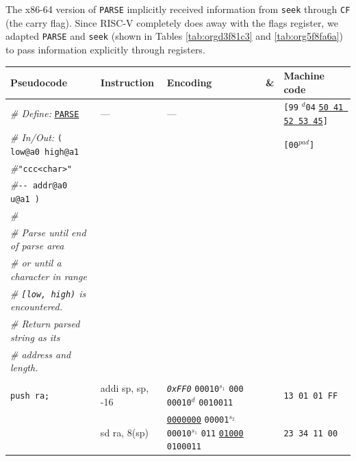 \documentclass[a4paper,12pt,final]{article}
\begin{document}
The x86-64 version of \texttt{PARSE} implicitly received information from
\texttt{seek} through \texttt{CF} (the carry flag).  Since RISC-V completely does
away with the flags register, we adapted \texttt{PARSE} and \texttt{seek} (shown in
Tables \ref{tab:orgd3f81c3} and \ref{tab:org5f8fa6a}) to pass information
explicitly through registers.

\begin{table}[!htbp] \begin{adjustwidth}{-1cm}{-1cm} \fontsize{8}{9.600000}\selectfont
\begin{center}
\begin{tabular}{l|ll|l|l}
\textbf{Pseudocode} & \textbf{Instruction} & \textbf{Encoding} & \textbf{\&} & \textbf{Machine code}\\[0pt]
\hline
\emph{\# Define:} \uline{\texttt{PARSE}} & --- & --- &  & \texttt{[99} \(^{d}\)​\texttt{04} \uline{\texttt{50 41 52 53 45}}​\texttt{]}\\[0pt]
\emph{\# In/Out:}    \texttt{( low@a0 high@a1} &  &  &  & \texttt{[00}​\(^{pad}\)​\texttt{]}\\[0pt]
\emph{\#}\hspace{4.9em}     ​\texttt{"ccc<char>"} &  &  &  & \\[0pt]
\emph{\#}\hspace{3.35em}​ \texttt{-​- addr@a0 u@a1 )} &  &  &  & \\[0pt]
\emph{\#} &  &  &  & \\[0pt]
\emph{\# Parse until end of parse area} &  &  &  & \\[0pt]
\emph{\# or until a character in range} &  &  &  & \\[0pt]
\emph{\# \texttt{[low, high)} is encountered.} &  &  &  & \\[0pt]
\emph{\# Return parsed string as its} &  &  &  & \\[0pt]
\emph{\# address and length.} &  &  &  & \\[0pt]
 &  &  &  & \\[0pt]
\hspace{1.053000em} \texttt{push ra;} & addi sp, sp, -16 & \emph{\texttt{0xFF0}}                    \texttt{00010}​\(^{s_{1}}\) \texttt{000} \texttt{00010}​\(^{d}\)  \texttt{0010011} &  & \texttt{13 01 01 FF}\\[0pt]
\hspace{1.053000em} & sd ra, 8(sp) & \uline{\texttt{0000000}} \texttt{00001}​\(^{s_{2}}\) \texttt{00010}​\(^{s_{1}}\) \texttt{011} \uline{\texttt{01000}} \texttt{0100011} &  & \texttt{23 34 11 00}\\[0pt]

\end{tabular}
\end{center}
\end{adjustwidth}
\end{table}
\end{document}
